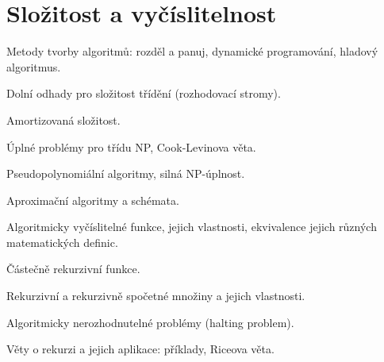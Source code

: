 \newpage
\section{Složitost a vyčíslitelnost}
\begin{pozadavky}
\begin{pitemize}
\item Metody tvorby algoritmů: rozděl a panuj, dynamické programování, hladový algoritmus.
\item Dolní odhady pro složitost třídění (rozhodovací stromy). 
\item Amortizovaná složitost. 
\item Úplné problémy pro třídu NP, Cook-Levinova věta.
\item Pseudopolynomiální algoritmy, silná NP-úplnost.
\item Aproximační algoritmy a schémata. 
\item Algoritmicky vyčíslitelné funkce, jejich vlastnosti, ekvivalence jejich různých matematických definic. 
\item Částečně rekurzivní funkce. 
\item Rekurzivní a rekurzivně spočetné množiny a jejich vlastnosti. 
\item Algoritmicky nerozhodnutelné problémy (halting problem). 
\item Věty o rekurzi a jejich aplikace: příklady, Riceova věta.
\end{pitemize}
\end{pozadavky}









